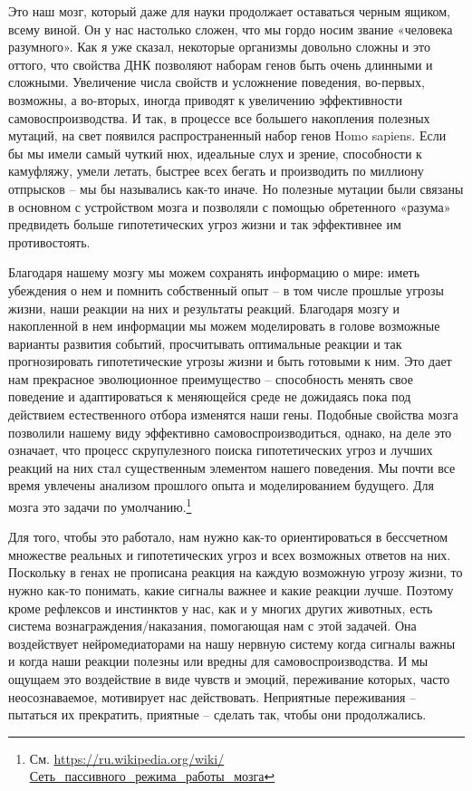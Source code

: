 \documentclass[12pt,a4paper]{report}
\begin{document}
\noindent Это наш мозг, который даже для науки продолжает оставаться черным ящиком, всему виной. Он у нас настолько сложен, что мы гордо носим звание «человека разумного». Как я уже сказал, некоторые организмы довольно сложны и это оттого, что свойства ДНК позволяют наборам генов быть очень длинными и сложными. Увеличение числа свойств и усложнение поведения, во-первых, возможны, а во-вторых, иногда приводят к увеличению эффективности самовоспроизводства. И так, в процессе все большего накопления полезных мутаций, на свет появился распространенный набор генов Homo sapiens. Если бы мы имели самый чуткий нюх, идеальные слух и зрение, способности к камуфляжу, умели летать, быстрее всех бегать и производить по миллиону отпрысков -- мы бы назывались как-то иначе. Но полезные мутации были связаны в основном с устройством мозга и позволяли с помощью обретенного «разума» предвидеть больше гипотетических угроз жизни и так эффективнее им противостоять.

\noindent Благодаря нашему мозгу мы можем сохранять информацию о мире: иметь убеждения о нем и помнить собственный опыт -- в том числе прошлые угрозы жизни, наши реакции на них и результаты реакций. Благодаря мозгу и накопленной в нем информации мы можем моделировать в голове возможные варианты развития событий, просчитывать оптимальные реакции и так прогнозировать гипотетические угрозы жизни и быть готовыми к ним. Это дает нам прекрасное эволюционное преимущество -- способность менять свое поведение и адаптироваться к меняющейся среде не дожидаясь пока под действием естественного отбора изменятся наши гены. Подобные свойства мозга позволили нашему виду эффективно самовоспроизводиться, однако, на деле это означает, что процесс скрупулезного поиска гипотетических угроз и лучших реакций на них стал существенным элементом нашего поведения. Мы почти все время увлечены анализом прошлого опыта и моделированием будущего. Для мозга это задачи по умолчанию.\footnote{См. \href{https://ru.wikipedia.org/wiki/\%D0\%A1\%D0\%B5\%D1\%82\%D1\%8C_\%D0\%BF\%D0\%B0\%D1\%81\%D1\%81\%D0\%B8\%D0\%B2\%D0\%BD\%D0\%BE\%D0\%B3\%D0\%BE_\%D1\%80\%D0\%B5\%D0\%B6\%D0\%B8\%D0\%BC\%D0\%B0_\%D1\%80\%D0\%B0\%D0\%B1\%D0\%BE\%D1\%82\%D1\%8B_\%D0\%BC\%D0\%BE\%D0\%B7\%D0\%B3\%D0\%B0}{https://ru.wikipedia.org/wiki/Сеть\_пассивного\_режима\_работы\_мозга}}

\noindent Для того, чтобы это работало, нам нужно как-то ориентироваться в бессчетном множестве реальных и гипотетических угроз и всех возможных ответов на них. Поскольку в генах не прописана реакция на каждую возможную угрозу жизни, то нужно как-то понимать, какие сигналы важнее и какие реакции лучше. Поэтому кроме рефлексов и инстинктов у нас, как и у многих других животных, есть система вознаграждения/наказания, помогающая нам с этой задачей. Она воздействует нейромедиаторами на нашу нервную систему когда сигналы важны и когда наши реакции полезны или вредны для самовоспроизводства. И мы ощущаем это воздействие в виде чувств и эмоций, переживание которых, часто неосознаваемое, мотивирует нас действовать. Неприятные переживания -- пытаться их прекратить, приятные -- сделать так, чтобы они продолжались.
\end{document}
